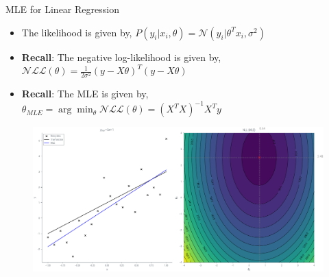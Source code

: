 \documentclass{beamer}
\begin{document}
    \begin{frame}{MLE for Linear Regression}
        \begin{itemize}
            \item The likelihood is given by,
            $P(y_i | x_i, \theta) = \mathcal{N}(y_i | \theta^T x_i, \sigma^2)$
            \item \textbf{Recall}: The negative log-likelihood is given by,
            $\mathcal{NLL}(\theta) = \frac{1}{2 \sigma^2} \left( y - X \theta \right)^T \left( y - X \theta \right)$
            \item \textbf{Recall}: The MLE is given by,
            $\theta_{MLE} =  \arg \min_{\theta} \mathcal{NLL} (\theta) = \left( X^T X \right)^{-1} X^T y$
        \end{itemize}
        \begin{figure}
            \centerline{\includegraphics[scale = 0.35]{../figures/map/linreg_mle.pdf}}
        \end{figure}

    \end{frame}

  
\end{document}
